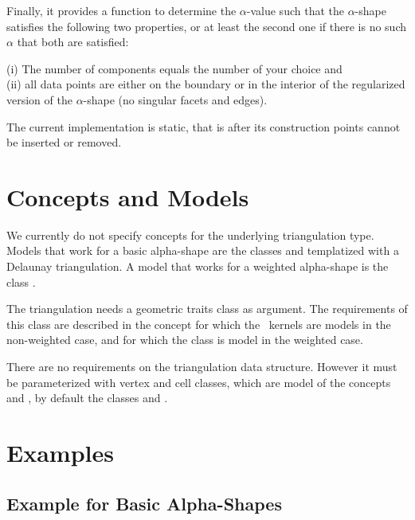 Finally, it provides a function to determine the $\alpha$-value
such that the $\alpha$-shape  satisfies the following two properties,
or at least the second one if there is no such $\alpha$ that both
are satisfied:

(i) The number of components equals the number of your choice and\\
(ii) all data points are either on the boundary or in the interior of the regularized version of 
the $\alpha$-shape (no singular facets and edges).

\smallskip
The current implementation is static, that is after its construction
points cannot be inserted or removed.

\section{Concepts and Models\label{I1_SectDtClass3D}}


We currently do not specify concepts for the underlying triangulation
type. Models that work for a basic alpha-shape are the classes
 and 
 templatized with a Delaunay
triangulation. A model that works for a weighted alpha-shape is 
the class .

The triangulation needs a geometric traits class as argument.
The requirements of this class are described in the 
concept  for which
the \cgal\ kernels are models in the non-weighted case, and for which
the class  is model
in the weighted case.

There are no requirements on the triangulation data structure.
However it must be parameterized with 
vertex and cell classes, which are model of the concepts
 and ,
by default the classes  
and .





\section{Examples}
\subsection{Example for Basic Alpha-Shapes\label{I1_SectClassicAS3D}}

